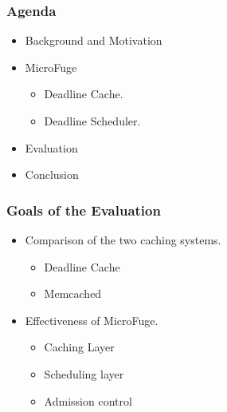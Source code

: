 \documentclass{beamer}
\begin{document}
\begin{frame}
  \frametitle{Agenda}
  \begin{itemize}
  \item[\Checkmark] Background and Motivation
  \item[\Checkmark] MicroFuge
    \begin{itemize}
    \item[\Checkmark] Deadline Cache.
    \item[\Checkmark] Deadline Scheduler.
    \end{itemize}
  \item Evaluation
  \item Conclusion
  \end{itemize}
\end{frame}

\begin{frame}
  \frametitle{Goals of the Evaluation}
  \begin{itemize}
    \item Comparison of the two caching systems.
      \begin{itemize}
        \item Deadline Cache
        \item Memcached
      \end{itemize}
    \item Effectiveness of MicroFuge.
      \begin{itemize}
      \item Caching Layer
      \item Scheduling layer
      \item Admission control
  \end{itemize}
  \end{itemize}
\end{frame}
\end{document}
